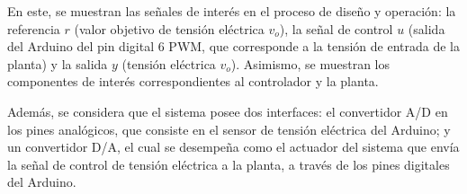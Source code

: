 En este, se muestran las señales de interés en el proceso de diseño y operación: la referencia $r$ (valor objetivo de tensión eléctrica $v_o$), la señal de control $u$ (salida del Arduino del pin digital 6 PWM, que corresponde a la tensión de entrada de la planta) y la salida $y$ (tensión eléctrica $v_o$).
Asimismo, se muestran los componentes de interés correspondientes al controlador y la planta.

Además, se considera que el sistema posee dos interfaces: el convertidor A/D en los pines analógicos, que consiste en el sensor de tensión eléctrica del Arduino; y un convertidor D/A, el cual se desempeña como el actuador del sistema que envía la señal de control de tensión eléctrica a la planta, a través de los pines digitales del Arduino.

